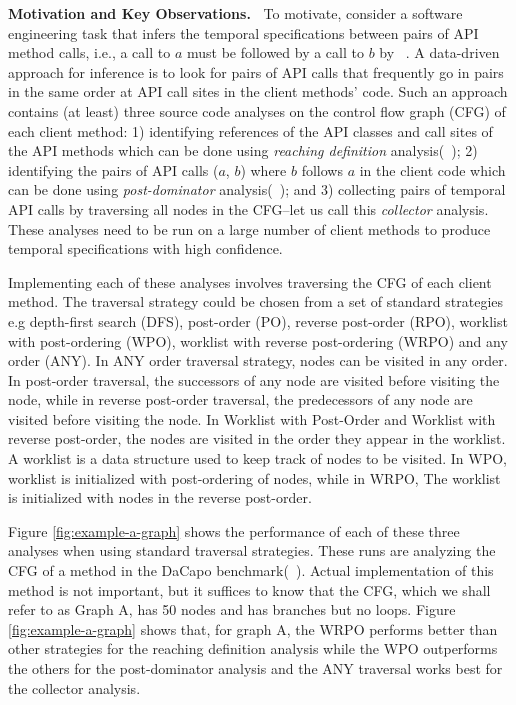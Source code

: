 {\bf Motivation and Key Observations.\ }
To motivate, consider a software engineering task that infers the temporal 
specifications between pairs of API method calls, i.e., a call to $a$ must be 
followed by a call to $b$ by ~\cite{engler-sosp2001,ramanathan-icse2007,weimer-tacas2005,yang-icse2006}. 
A data-driven approach for inference is to look for pairs of API calls that frequently go in pairs in 
the same order at API call sites in the client methods' code. Such an 
approach contains (at least) three source code analyses on the control flow graph 
(CFG) of each client method: 
%
1) identifying references of the API classes and call sites of the API 
methods which can be done using \emph{reaching definition} analysis(~\cite{programanalysis}); 
%
2) identifying the pairs of API calls ($a$, $b$) where $b$ follows $a$ in the 
client code which can be done using \emph{post-dominator} analysis(~\cite{compilers}); and 
%
3) collecting pairs of temporal API calls by traversing all nodes in the 
CFG--let us call this \emph{collector} analysis. 
%
These analyses need to be run on a large number of client methods to 
produce temporal specifications with high confidence.

Implementing each of these analyses involves traversing the CFG 
of each client method. The traversal strategy could be chosen from a 
set of standard strategies e.g depth-first search (DFS), post-order 
(PO), reverse post-order (RPO), worklist with post-ordering (WPO), 
worklist with reverse post-ordering (WRPO) and any order (ANY).
In ANY order traversal strategy, nodes can
be visited in any order. In post-order traversal, the successors of
any node are visited before visiting the node, while in reverse post-order traversal, the
predecessors of any node are visited before visiting the node. In Worklist with Post-Order and Worklist with reverse post-order, the nodes are visited in the order they appear in the worklist. A worklist is a
data structure used to keep track of nodes to be visited. In WPO, worklist is
initialized with post-ordering of nodes, while in WRPO, The
worklist is initialized with nodes in the reverse post-order.

Figure \ref{fig:example-a-graph} shows the performance of each of these three 
analyses when using standard traversal strategies.
These runs are analyzing the CFG of a method in the DaCapo 
benchmark(~\cite{blackburn2006dacapo}). 
Actual implementation of this method is not important, but it suffices
to know that the CFG, which we shall refer to as Graph A, has 50 nodes
and has branches but no loops. Figure \ref{fig:example-a-graph} shows
that, for graph A, the WRPO performs better than other strategies for
the reaching definition analysis while the WPO outperforms the others
for the post-dominator analysis and the ANY traversal works best for
the collector analysis.

